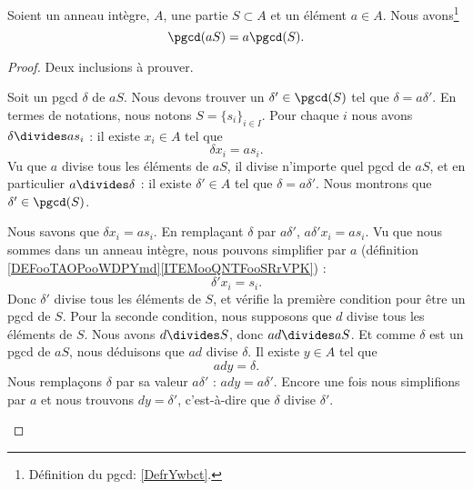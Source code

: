 \begin{lemma}		\label{LEMooMHZQooIcSNSf}
	Soient un anneau intègre, \( A\), une partie \( S\subset A\) et un élément \( a\in A\). Nous avons\footnote{Définition du pgcd: \ref{DefrYwbct}.}
	\begin{equation}
		\pgcd(aS)=a\pgcd(S).
	\end{equation}
\end{lemma}

\begin{proof}
	Deux inclusions à prouver.
	\begin{subproof}
		Soit un pgcd \( \delta\) de \( aS\). Nous devons trouver un \( \delta'\in\pgcd(S)\) tel que \( \delta=a\delta'\). En termes de notations, nous notons \( S=\{ s_i \}_{i\in I}\). Pour chaque \( i\) nous avons \( \delta\divides as_i\) : il existe \( x_i\in A\) tel que
		\begin{equation}
			\delta x_i=as_i.
		\end{equation}
		Vu que \( a\) divise tous les éléments de \( aS\), il divise n'importe quel pgcd de \( aS\), et en particulier \( a\divides \delta\) : il existe \( \delta'\in A\) tel que \( \delta=a\delta'\). Nous montrons que \( \delta'\in\pgcd(S)\).

		Nous savons que \( \delta x_i=as_i\). En remplaçant \( \delta\) par \( a\delta'\), \( a\delta'x_i=as_i\). Vu que nous sommes dans un anneau intègre, nous pouvons simplifier par \( a\) (définition \ref{DEFooTAOPooWDPYmd}\ref{ITEMooQNTFooSRrVPK}) :
		\begin{equation}
			\delta'x_i=s_i.
		\end{equation}
		Donc \( \delta'\) divise tous les éléments de \( S\), et vérifie la première condition pour être un pgcd de \( S\). Pour la seconde condition, nous supposons que \( d\) divise tous les éléments de \( S\). Nous avons \( d\divides S\), donc \( ad\divides aS\). Et comme \( \delta\) est un pgcd de \( aS\), nous déduisons que \( ad\) divise \( \delta\). Il existe \( y\in A\) tel que
		\begin{equation}
			ady=\delta.
		\end{equation}
		Nous remplaçons \( \delta\) par sa valeur \( a\delta'\) : \( ady=a\delta'\). Encore une fois nous simplifions par \( a\) et nous trouvons \( dy=\delta'\), c'est-à-dire que \( \delta\) divise \( \delta'\).



\end{subproof}
\end{proof}
